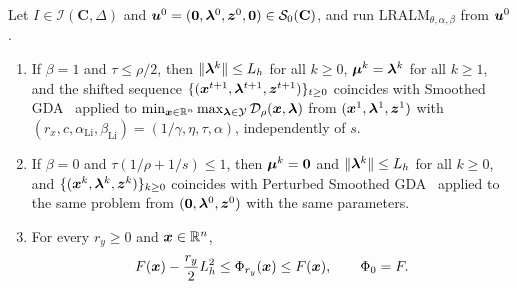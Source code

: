 \begin{lemma}
\label{lem:ub-reduction}
Let \(I\in\mathcal I(\mathbf C,\Delta)\) and
\(\bm{u}^0=(\bm{0},\bm{\lambda}^0,\bm{z}^0,\bm{0})\in\mathcal S_0(\mathbf C)\), and run
\(\mathrm{LRALM}_{\theta,\alpha,\beta}\) from \(\bm{u}^0\).
\begin{enumerate}[label=(\roman*)]
\item If \(\beta=1\) and \(\tau\le\rho/2\), then \(\|\bm{\lambda}^k\|\le L_h\) for
all \(k\ge0\), \(\bm{\mu}^k=\bm{\lambda}^k\) for all \(k\ge1\), and the shifted sequence
\(\{(\bm{x}^{t+1},\bm{\lambda}^{t+1},\bm{z}^{t+1})\}_{t\ge0}\) coincides with Smoothed
GDA~\cite[Algorithm~3, \(r_y=0\)]{li2026smoothing} applied to
\(\min_{\bm{x}\in\mathbb{R}^n}\max_{\bm{\lambda}\in\mathcal Y}\mathcal{D}_\rho(\bm{x},\bm{\lambda})\) from
\((\bm{x}^1,\bm{\lambda}^1,\bm{z}^1)\) with
\((r_x,c,\alpha_{\mathrm{Li}},\beta_{\mathrm{Li}})=(1/\gamma,\eta,\tau,\alpha)\),
independently of \(s\).
\item If \(\beta=0\) and \(\tau(1/\rho+1/s)\le1\), then \(\bm{\mu}^k=\bm{0}\) and
\(\|\bm{\lambda}^k\|\le L_h\) for all \(k\ge0\), and
\(\{(\bm{x}^k,\bm{\lambda}^k,\bm{z}^k)\}_{k\ge0}\) coincides with Perturbed Smoothed
GDA~\cite[Algorithm~3, \(r_y=1/s\)]{li2026smoothing} applied to the same
problem from \((\bm{0},\bm{\lambda}^0,\bm{z}^0)\) with the same parameters.
\item For every \(r_y\ge0\) and \(\bm{x}\in\mathbb{R}^n\),
\begin{equation}
F(\bm{x})-\frac{r_y}{2}L_h^2\le\Phi_{r_y}(\bm{x})\le F(\bm{x}),
\qquad \Phi_0=F.
\label{eq:ub-bridge}
\end{equation}
\end{enumerate}
\end{lemma}

